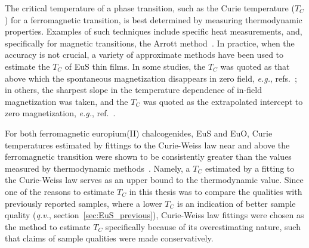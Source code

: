 The critical temperature of a phase transition, such as the Curie temperature ($T_C$) for a ferromagnetic transition, is best determined by measuring thermodynamic properties. Examples of such techniques include specific heat measurements, and, specifically for magnetic transitions, the Arrott method~\cite{Arrott1957}. In practice, when the accuracy is not crucial, a variety of approximate methods have been used to estimate the $T_C$ of EuS thin films. In some studies, the $T_C$ was quoted as that above which the spontaneous magnetization disappears in zero field, \textit{e.g.}, refs.~\cite{EuS_MBE_Dauth, Moodera2013}; in others, the sharpest slope in the temperature dependence of in-field magnetization was taken, and the $T_C$ was quoted as the extrapolated intercept to zero magnetization, \textit{e.g.}, ref.~\cite{EuS_PLD1}.

For both ferromagnetic europium(II) chalcogenides, EuS and EuO, Curie temperatures estimated by fittings to the Curie-Weiss law near and above the ferromagnetic transition were shown to be consistently greater than the values measured by thermodynamic methods~\cite{Eu_mag_compounds}. Namely, a $T_C$ estimated by a fitting to the Curie-Weiss law serves as an upper bound to the thermodynamic value. Since one of the reasons to estimate $T_C$ in this thesis was to compare the qualities with previously reported samples, where a lower $T_C$ is an indication of better sample quality (\textit{q.v.}, section~\ref{sec:EuS_previous}), Curie-Weiss law fittings were chosen as the method to estimate $T_C$ specifically because of its overestimating nature, such that claims of sample qualities were made conservatively.

